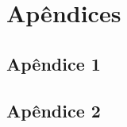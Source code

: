\appendix

\section{Apêndices}

\subsection{Apêndice 1} \label{app:apendice_1}

\lipsum[1]

\subsection{Apêndice 2} \label{app:apendice_2}

\lipsum[2]
